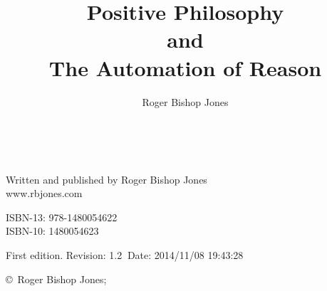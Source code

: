 \documentclass[10pt,titlepage]{book}
\title{Positive Philosophy\\ and\\ The Automation of Reason}
\author{Roger Bishop Jones}
\date{\ }
\begin{document}
\frontmatter

\begin{titlepage}
\maketitle


\hspace{2in}

\vfill

\begin{centering}

Written and published by Roger Bishop Jones\\
www.rbjones.com\\
\vspace{0.2in}

ISBN-13: 978-1480054622\\
ISBN-10: 1480054623

\vspace{0.2in}

{\footnotesize

First edition. $ $Revision: 1.2 $~$Date: 2014/11/08 19:43:28 $ $

\vspace{0.2in}

\copyright\ Roger Bishop Jones;

}%

\end{centering}

\thispagestyle{empty}

\end{titlepage}
\end{document}
